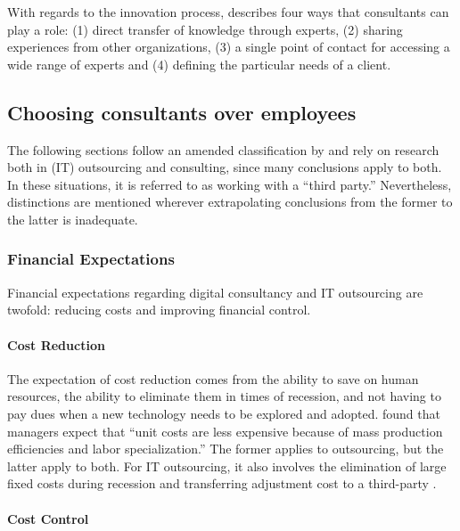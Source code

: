 \documentclass[12pt]{article}
\begin{document}
With regards to the innovation process, \citet[101-102]{bessant1995}
describes four ways that consultants can play a role: (1) direct
transfer of knowledge through experts, (2) sharing experiences from
other organizations, (3) a single point of contact for accessing a wide
range of experts and (4) defining the particular needs of a client.

\subsection{Choosing consultants over
employees}\label{choosing-consultants-over-employees}

The following sections follow an amended classification by
\citet{lacity1994} and rely on research both in (IT) outsourcing and
consulting, since many conclusions apply to both. In these situations,
it is referred to as working with a ``third party.'' Nevertheless,
distinctions are mentioned wherever extrapolating conclusions from the
former to the latter is inadequate.

\subsubsection{Financial Expectations}\label{financial-expectations}

Financial expectations regarding digital consultancy and IT outsourcing
are twofold: reducing costs and improving financial control.

\paragraph{Cost Reduction}\label{cost-reduction}

The expectation of cost reduction comes from the ability to save on
human resources, the ability to eliminate them in times of recession,
and not having to pay dues when a new technology needs to be explored
and adopted. \citet[10]{lacity1994} found that managers expect that
``unit costs are less expensive because of mass production efficiencies
and labor specialization.'' The former applies to outsourcing, but the
latter apply to both. For IT outsourcing, it also involves the
elimination of large fixed costs during recession and transferring
adjustment cost to a third-party \citep[ 52]{aubert1996}.

\paragraph{Cost Control}\label{cost-control}
\end{document}
